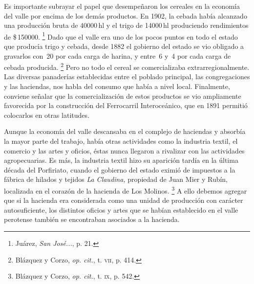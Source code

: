 \documentclass[14pt,twoside,final]{extbook} %
\let\oldfootnote\footnote
\renewcommand\footnote[1]{%
\oldfootnote{\hspace{1mm}#1}}
\begin{document}
Es importante subrayar el papel que desempeñaron los cereales en la economía del valle por encima de los demás productos. En 1902, la cebada había alcanzado una producción bruta de 40000\,hl y el trigo de 14000\,hl produciendo rendimientos de \$\,150000.\footnote{Juárez, \emph{San José...}, p. 21.} Dado que el valle era uno de los pocos puntos en todo el estado que producía trigo y cebada, desde 1882 el gobierno del estado se vio obligado a gravarlos con \textcent{}\,20 por cada carga de harina, y entre \textcent{}\,6 y \textcent{}\,4 por cada carga de cebada producida.\footnote{Blázquez y Corzo, \emph{op. cit.}, t. \textsc{vii}, p. 414.} Pero no todo el cereal se comercializaba extrarregionalmente. Las diversas panaderías establecidas entre el poblado principal, las congregaciones y las haciendas, nos habla del consumo que había a nivel local. Finalmente, conviene señalar que la comercialización de estos productos se vio ampliamente favorecida por la construcción del Ferrocarril Interoceánico, que en 1891 permitió colocarlos en otras latitudes.

Aunque la economía del valle descansaba en el complejo de haciendas y absorbía la mayor parte del trabajo, había otras actividades como la industria textil, el comercio y las artes y oficios, éstas nunca llegaron a rivalizar con las actividades agropecuarias. Es más, la industria textil hizo su aparición tardía en la última década del Porfiriato, cuando el gobierno del estado eximió de impuestos a la fábrica de hilados y tejidos \emph{La Claudina,} propiedad de Juan Mier y Rubín, localizada en el corazón de la hacienda de Los Molinos.\footnote{Blázquez y Corzo, \emph{op. cit.}, t. \textsc{ix}, p. 542.} A ello debemos agregar que si la hacienda era considerada como una unidad de producción con carácter autosuficiente, los distintos oficios y artes que se habían establecido en el valle perotense también se encontraban asociados a la hacienda.
\end{document}
